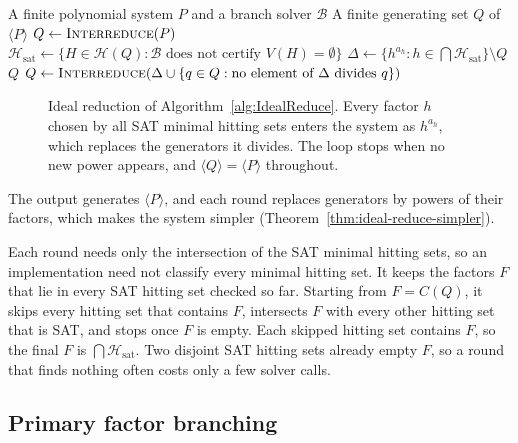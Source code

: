 \begin{algorithm}[htbp]
  \caption{Ideal reduction}
  \label{alg:IdealReduce}
  \begin{algorithmic}[1]
    \Require A finite polynomial system $P$ and a branch solver $\mathcal B$
    \Ensure A finite generating set $Q$ of $\langle P\rangle$
    \State $Q\gets\Call{Interreduce}{P}$
    \Loop
    \State $\mathcal H_{\mathrm{sat}}\gets\{H\in\mathcal H(Q):\mathcal B
    \text{ does not certify }V(H)=\emptyset\}$
    \State $\Delta\gets\{h^{a_h}:h\in\bigcap\mathcal
    H_{\mathrm{sat}}\}\setminus Q$
    \If{$\Delta=\emptyset$}
    \State \Return $Q$
    \EndIf
    \State $Q\gets\Call{Interreduce}{\Delta\cup\{q\in Q:\text{no
          element of $\Delta$
    divides $q$}\}}$
    \EndLoop
  \end{algorithmic}
\end{algorithm}

\begin{figure}[pos=htbp]
  \centering
  \resizebox{0.62\textwidth}{!}{}
  \caption{Ideal reduction of Algorithm~\ref{alg:IdealReduce}. Every factor $h$ chosen by
    all SAT minimal hitting sets enters the system as $h^{a_h}$, which replaces
    the generators it divides. The loop stops when no new power appears, and $
    \langle Q\rangle=\langle P\rangle$ throughout.}
  \label{fig:ideal_reduce_flowchart}
\end{figure}

The output generates $\langle P\rangle$, and each round replaces generators
by powers of their factors, which makes the system simpler
(Theorem~\ref{thm:ideal-reduce-simpler}).

Each round needs only the intersection of the SAT minimal hitting sets, so an
implementation need not classify every minimal hitting set. It keeps the
factors $F$ that lie in every SAT hitting set checked so far. Starting from
$F=C(Q)$, it skips every hitting set that contains $F$, intersects $F$ with
every other hitting set that is SAT, and stops once $F$ is empty.
Each skipped hitting set contains $F$, so the final $F$ is
$\bigcap\mathcal H_{\mathrm{sat}}$. Two disjoint SAT hitting sets already
empty $F$, so a round that finds nothing often costs only a few solver calls.

\subsection{Primary factor branching}
\label{subsec:primary-decomposition}

